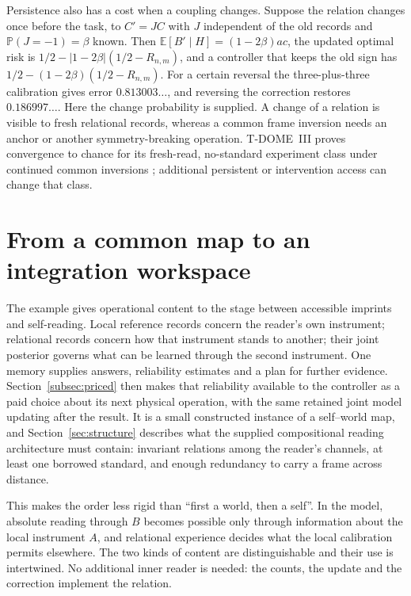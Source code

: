 \documentclass[11pt,a4paper]{article}
\newcommand{\E}{\mathbb E}
\newcommand{\Pp}{\mathbb P}
\begin{document}
Persistence also has a cost when a coupling changes. Suppose the relation changes once before the task, to $C'=JC$ with $J$ independent of the old records and $\Pp(J=-1)=\beta$ known. Then $\E[B'\mid H]=(1-2\beta)ac$, the updated optimal risk is $1/2-|1-2\beta|(1/2-R_{n,m})$, and a controller that keeps the old sign has $1/2-(1-2\beta)(1/2-R_{n,m})$. For a certain reversal the three-plus-three calibration gives error $0.813003\ldots$, and reversing the correction restores $0.186997\ldots$. Here the change probability is supplied. A change of a relation is visible to fresh relational records, whereas a common frame inversion needs an anchor or another symmetry-breaking operation. T-DOME~III proves convergence to chance for its fresh-read, no-standard experiment class under continued common inversions \cite{TDOMEIII}; additional persistent or intervention access can change that class.

\section{From a common map to an integration workspace}\label{sec:interfaces}

The example gives operational content to the stage between accessible imprints and self-reading. Local reference records concern the reader's own instrument; relational records concern how that instrument stands to another; their joint posterior governs what can be learned through the second instrument. One memory supplies answers, reliability estimates and a plan for further evidence. Section~\ref{subsec:priced} then makes that reliability available to the controller as a paid choice about its next physical operation, with the same retained joint model updating after the result. It is a small constructed instance of a self--world map, and Section~\ref{sec:structure} describes what the supplied compositional reading architecture must contain: invariant relations among the reader's channels, at least one borrowed standard, and enough redundancy to carry a frame across distance.

This makes the order less rigid than ``first a world, then a self''. In the model, absolute reading through $B$ becomes possible only through information about the local instrument $A$, and relational experience decides what the local calibration permits elsewhere. The two kinds of content are distinguishable and their use is intertwined. No additional inner reader is needed: the counts, the update and the correction implement the relation.
\end{document}
